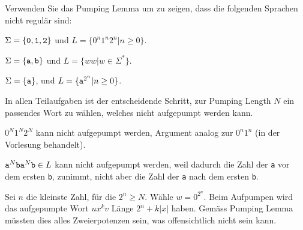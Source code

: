 Verwenden Sie das Pumping Lemma um zu zeigen, dass die folgenden
Sprachen nicht regulär sind:
\begin{teilaufgaben}
\item $\Sigma=\{{\tt 0},{\tt 1},{\tt 2}\}$ und $L=\{ 0^n1^n2^n |n\ge 0\}$.
\item $\Sigma=\{{\tt a},{\tt b}\}$ und $L=\{ww|w\in \Sigma^*\}$.
\item $\Sigma=\{{\tt a}\}$, und $L=\{{\tt a}^{2^n}|n\ge 0\}$.
\end{teilaufgaben}


\begin{loesung}
In allen Teilaufgaben ist der entscheidende Schritt, zur Pumping Length
$N$ ein passendes Wort zu wählen, welches nicht aufgepumpt werden kann.
\begin{teilaufgaben}
\item $0^N1^N2^N$ kann nicht aufgepumpt werden, Argument analog zur
$0^n1^n$ (in der Vorlesung behandelt).
\item ${\tt a}^N{\tt ba}^N{\tt b}\in L$ kann nicht aufgepumpt werden,
weil dadurch die Zahl der {\tt a} vor dem ersten {\tt b}, zunimmt,
nicht aber die Zahl der {\tt a} nach dem ersten {\tt b}.
\item
Sei $n$ die kleinste Zahl, für die $2^n\ge N$. Wähle $w=0^{2^n}$.
Beim Aufpumpen wird das aufgepumpte Wort $ux^kv$ Länge $2^n+k|x|$
haben. Gemäss Pumping Lemma müssten dies alles Zweierpotenzen sein,
was offensichtlich nicht sein kann.
\qedhere
\end{teilaufgaben}
\end{loesung}

